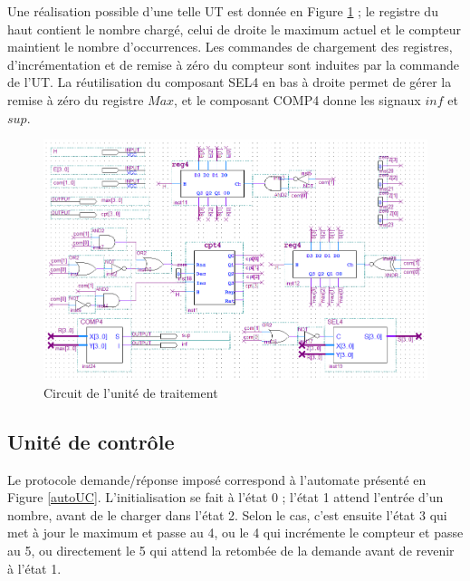 \documentclass[a4paper,11pt]{article}
\begin{document}
Une réalisation possible d'une telle UT est donnée en Figure \ref{UT} ; le registre du haut contient le nombre chargé, celui de droite le maximum actuel et le compteur maintient le nombre d'occurrences. Les commandes de chargement des registres, d'incrémentation et de remise à zéro du compteur sont induites par la commande de l'UT. La réutilisation du composant SEL4 en bas à droite permet de gérer la remise à zéro du registre $Max$, et le composant COMP4 donne les signaux $inf$ et $sup$.

\begin{figure}[h]
\center
\includegraphics[scale=0.6]{UT.png}
\caption{Circuit de l'unité de traitement}
\label{UT}
\end{figure}

\subsection*{Unité de contrôle}

Le protocole demande/réponse imposé correspond à l'automate présenté en Figure \ref{autoUC}. L'initialisation se fait à l'état 0 ; l'état 1 attend l'entrée d'un nombre, avant de le charger dans l'état 2. Selon le cas, c'est ensuite l'état 3 qui met à jour le maximum et passe au 4, ou le 4 qui incrémente le compteur et passe au 5, ou directement le 5 qui attend la retombée de la demande avant de revenir à l'état 1.
\end{document}

